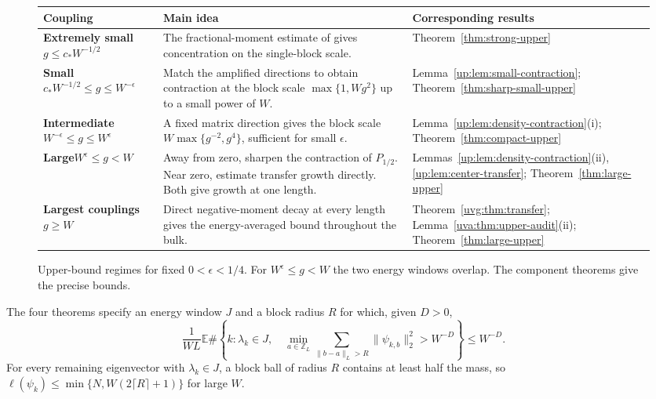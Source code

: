 \documentclass[11pt]{article}
\numberwithin{equation}{section}
\theoremstyle{remark}
\newcommand{\E}{\mathbb E}
\newcommand{\Z}{\mathbb Z}
\begin{document}
\begin{figure}[H]
\centering
\renewcommand{\arraystretch}{1.35}
\fontsize{8.5}{10.5}\selectfont
\begin{tabularx}{\textwidth}{@{}p{}p{}X@{}}
\toprule
\textbf{Coupling} & \textbf{Main idea} & \textbf{Corresponding results}\\
\midrule
\textbf{Extremely small}\newline $g\le c_* W^{-1/2}$
& The fractional-moment estimate of \cite{PSSS} gives concentration on the single-block scale.
& Theorem~\ref{thm:strong-upper}\\[3pt]
\textbf{Small}\newline $c_*W^{-1/2}\le g\le W^{-\epsilon}$
& Match the amplified directions to obtain contraction at the block scale $\max\{1,Wg^2\}$ up to a small power of $W$.
& Lemma~\ref{up:lem:small-contraction}; Theorem~\ref{thm:sharp-small-upper}\\[3pt]
\textbf{Intermediate}\newline $W^{-\epsilon}\le g\le W^\epsilon$
& A fixed matrix direction gives the block scale $W\max\{g^{-2},g^4\}$, sufficient for small $\epsilon$.
& Lemma~\ref{up:lem:density-contraction}(i); Theorem~\ref{thm:compact-upper}\\[3pt]
\textbf{Large}\newline $W^\epsilon\le g<W$
& Away from zero, sharpen the contraction of $P_{1/2}$. Near zero, estimate transfer growth directly. Both give growth at one length.
& Lemmas~\ref{up:lem:density-contraction}(ii), \ref{up:lem:center-transfer}; Theorem~\ref{thm:large-upper}\\[3pt]
\textbf{Largest couplings}\newline $g\ge W$
& Direct negative-moment decay at every length gives the energy-averaged bound throughout the bulk.
& Theorem~\ref{uvg:thm:transfer}; Lemma~\ref{uva:thm:upper-audit}(ii); Theorem~\ref{thm:large-upper}\\
\bottomrule
\end{tabularx}
\normalsize
\caption{Upper-bound regimes for fixed $0<\epsilon<1/4$. For $W^\epsilon\le g<W$ the two energy windows overlap. The component theorems give the precise bounds.}
\label{fig:upper-ranges}
\end{figure}

The four theorems specify an energy window $J$ and a block radius $R$
for which, given $D>0$,
\begin{equation}\label{eq:averaged-tail}
 \frac1{WL}\E\#\left\{k:\lambda_k\in J,\quad
 \min_{a\in\Z_L}\sum_{\|b-a\|_L>R}\|\psi_{k,b}\|_2^2>W^{-D}\right\}
 \le W^{-D}.
\end{equation}
For every remaining eigenvector with $\lambda_k\in J$, a block ball of radius
$R$ contains at least half the mass, so $\ell(\psi_k)\le\min\{N,W(2\lceil R\rceil+1)\}$
for large $W$.
\end{document}

